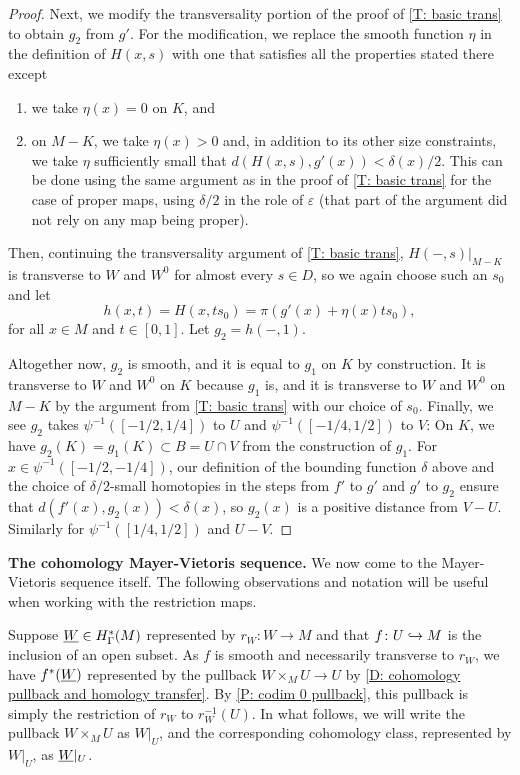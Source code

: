 \begin{proof}
	Next, we modify the transversality portion of the proof of \cref{T: basic trans} to obtain $g_2$ from $g'$.
	For the modification, we replace the smooth function $\eta$ in the definition of $H(x,s)$ with one that satisfies all the properties stated there except
	\begin{enumerate}
		\item we take $\eta(x)=0$ on $K$, and
		\item on $M - K$, we take $\eta(x) > 0$ and, in addition to its other size constraints, we take $\eta$ sufficiently small that $d(H(x,s),g'(x)) < \delta(x)/2$.
		This can be done using the same argument as in the proof of \cref{T: basic trans} for the case of proper maps, using $\delta/2$ in the role of $\varepsilon$ (that part of the argument did not rely on any map being proper).
	\end{enumerate}
	Then, continuing the transversality argument of \cref{T: basic trans}, $H(-,s)|_{M-K}$ is transverse to $W$ and $W^0$ for almost every $s \in D$, so we again choose such an $s_0$ and let $$h(x,t) = H(x, ts_0) = \pi(g'(x) + \eta(x)ts_0),$$ for all $x \in M$ and $t \in [0,1]$.
	Let $g_2 = h(-,1)$.

	Altogether now, $g_2$ is smooth, and it is equal to $g_1$ on $K$ by construction.
	It is transverse to $W$ and $W^0$ on $K$ because $g_1$ is, and it is transverse to $W$ and $W^0$ on $M - K$ by the argument from \cref{T: basic trans} with our choice of $s_0$.
	Finally, we see $g_2$ takes $\psi^{-1}([-1/2,1/4])$ to $U$ and $\psi^{-1}([-1/4,1/2])$ to $V$: On $K$, we have $g_2(K) = g_1(K) \subset B = U \cap V$ from the construction of $g_1$.
	For $x\in \psi^{-1}([-1/2,-1/4])$, our definition of the bounding function $\delta$ above and the choice of $\delta/2$-small homotopies in the steps from $f'$ to $g'$ and $g'$ to $g_2$ ensure that $d(f'(x), g_2(x)) < \delta(x)$, so $g_2(x)$ is a positive distance from $V - U$.
	Similarly for $\psi^{-1}([1/4,1/2])$ and $U - V$.
\end{proof}


\medskip

\noindent\textbf{The cohomology Mayer-Vietoris sequence.} We now come to the Mayer-Vietoris sequence itself.
The following observations and notation will be useful when working with the restriction maps.

Suppose $\underline{W} \in H^*_\Gamma(M)$ represented by $r_W \colon W \to M$ and that $f \colon U \hookrightarrow M$ is the inclusion of an open subset.
As $f$ is smooth and necessarily transverse to $r_W$, we have $f^*(\underline{W})$ represented by the pullback $W \times_M U \to U$ by \cref{D: cohomology pullback and homology transfer}.	By \cref{P: codim 0 pullback}, this pullback is simply the restriction of $r_W$ to $r_W^{-1}(U)$.
In what follows, we will write the pullback $W \times_M U$ as $W|_U$, and the corresponding cohomology class, represented by $W|_U$, as $\underline{W}|_U$.

